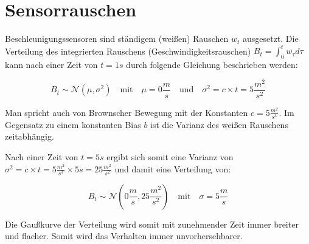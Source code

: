 \documentclass[12pt,a4paper]{report}
\begin{document}
\chapter{Sensorrauschen}

Beschleunigungssensoren sind ständigem (weißen) Rauschen \(w_t\) ausgesetzt. Die Verteilung des integrierten Rauschens (Geschwindigkeitsrauschen) \(B_t = \int_0^t w_\tau d\tau\) kann nach einer Zeit von \(t = 1s\) durch folgende Gleichung beschrieben werden:

\[
    B_t \sim \mathcal{N}(\mu, \sigma^2) \quad \text{mit} \quad \mu = 0 \frac{m}{s} \quad \text{und} \quad \sigma^2 = c \times t = 5 \frac{m^2}{s^2}
\]

Man spricht auch von Brownscher Bewegung mit der Konstanten \(c = 5 \frac{m^2}{s^3}\). Im Gegensatz zu einem konstanten Bias \(b\) ist die Varianz des weißen Rauschens zeitabhängig.

Nach einer Zeit von \(t=5s\) ergibt sich somit eine Varianz von \(\sigma^2 = c \times t = 5 \frac{m^2}{s^3} \times 5s = 25 \frac{m^2}{s^2}\) und damit eine Verteilung von:

\[
    B_t \sim \mathcal{N}(0 \frac{m}{s}, 25 \frac{m^2}{s^2}) \quad \text{mit} \quad \sigma = 5 \frac{m}{s}
\]

Die Gaußkurve der Verteilung wird somit mit zunehmender Zeit immer breiter und flacher. Somit wird das Verhalten immer unvorhersehbarer.

\clearpage
\printbibliography[heading=bibintoc]
\end{document}
